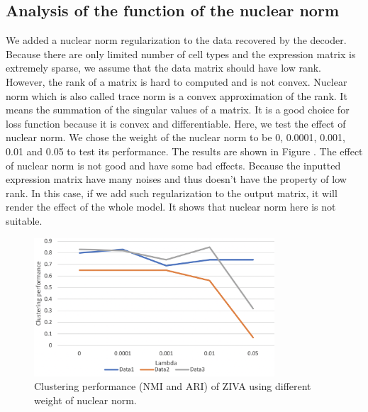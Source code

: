 \clearpage

\subsection{Analysis of the function of the nuclear norm}
We added a nuclear norm \cite{Zhang_2010} regularization to the data recovered by the decoder. Because there are only limited number of cell types and the expression matrix is extremely sparse, we assume that the data matrix should have low rank. However, the rank of a matrix is hard to computed and is not convex. Nuclear norm which is also called trace norm is a convex approximation of the rank. It means the summation of the singular values of a matrix. It is a good choice for loss function because it is convex and differentiable. Here, we test the effect of nuclear norm. We chose the weight of the nuclear norm to be 0, 0.0001, 0.001, 0.01 and 0.05 to test its performance. The results are shown in Figure \cite{nuclear}. The effect of nuclear norm is not good and have some bad effects. Because the inputted expression matrix have many noises and thus doesn't have the property of low rank. In this case, if we add such regularization to the output matrix, it will render the effect of the whole model. It shows that nuclear norm here is not suitable.

\begin{figure}[htb!]
    \centering
    \includegraphics[width=0.8\textwidth]{figures/myfigures/nuclear.png}
    \caption{Clustering performance (NMI and ARI) of ZIVA using different weight of nuclear norm.}
    \label{nuclear}
\end{figure}

\clearpage


